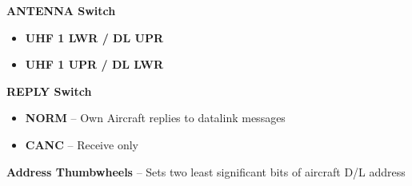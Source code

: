 \documentclass[fontMetropolis]{TechCheck}
\begin{document}
\begin{tableitemize}
{\begin{subitemize}
\begin{itemize}
			\end{itemize}
			\item \textbf{ANTENNA Switch}
			\begin{itemize}
				\item \textbf{UHF 1 LWR / DL UPR}
				\item \textbf{UHF 1 UPR / DL LWR}
			\end{itemize}
			\item \textbf{REPLY Switch}
			\begin{itemize}
				\item \textbf{NORM} -- Own Aircraft replies to datalink messages
				\item\textbf{CANC} -- Receive only
			\end{itemize}
			\item \textbf{Address Thumbwheels} -- Sets two least significant bits of aircraft D/L address
		\end{subitemize}}
	\end{tableitemize}


	\clearpage
\end{document}
